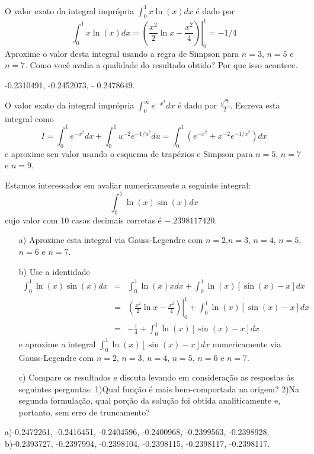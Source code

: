 \begin{Exercise}
O valor exato da integral imprópria $\int_0^1x\ln(x)dx$ é dado por
$$\int_0^1x\ln(x)dx=\left.\left(\frac{x^2}{2}\ln x-\frac{x^2}{4}\right)\right|_0^1=-1/4$$
Aproxime o valor desta integral usando a regra  de Simpson para $n=3$, $n=5$ e $n=7$. Como você avalia a qualidade do resultado obtido? Por que isso acontece.
\end{Exercise}
\begin{Answer}
  \begin{tiny}
-0.2310491, -0.2452073, - 0.2478649.    
  \end{tiny}
\end{Answer}

\begin{Exercise}
O valor exato da integral imprópria $\int_0^\infty e^{-x^2}dx$ é dado por $\frac{\sqrt{\pi}}{2}$.
Escreva esta integral como
$$I=\int_0^1 e^{-x^2}dx+\int_0^1 u^{-2} e^{-1/u^2}du=\int_0^1 \left(e^{-x^2}+x^{-2}e^{-1/x^2}\right)dx$$
e aproxime seu valor usando o esquema de trapézios e Simpson para $n=5$, $n=7$ e $n=9$.
\end{Exercise}

\begin{Exercise}
Estamos interessados em avaliar numericamente a seguinte integral:
$$\int_0^1 \ln(x)\sin(x)dx$$
cujo valor com 10 casas decimais corretas é $-.2398117420$.
\begin{itemize}
\item[a)] Aproxime esta integral via Gauss-Legendre com $n=2$,$n=3$, $n=4$, $n=5$, $n=6$ e $n=7$.
\item[b)] Use a identidade
\begin{eqnarray*}
\int_0^1 \ln(x)\sin(x)dx&=&\int_0^1 \ln(x)xdx+\int_0^1 \ln(x)\left[\sin(x)-x\right]dx\\
&=&\left.\left(\frac{x^2}{2}\ln x-\frac{x^2}{4}\right)\right|_0^1+\int_0^1 \ln(x)\left[\sin(x)-x\right]dx\\
&=&-\frac{1}{4}+\int_0^1 \ln(x)\left[\sin(x)-x\right]dx
\end{eqnarray*}
e aproxime a integral $\int_0^1 \ln(x)\left[\sin(x)-x\right]dx$ numericamente via Gauss-Legendre com $n=2$, $n=3$, $n=4$, $n=5$, $n=6$ e $n=7$.
\item[c)] Compare os resultados e discuta levando em consideração as respostas às seguintes perguntas: 1)Qual função é mais bem-comportada na origem? 2)Na segunda formulação, qual porção da solução foi obtida analiticamente e, portanto, sem erro de truncamento?
\end{itemize}
\end{Exercise}
\begin{Answer}
  \begin{tiny}
    a)-0.2472261,  -0.2416451,  -0.2404596,  -0.2400968,  -0.2399563,  -0.2398928.
    b)-0.2393727,  -0.2397994,  -0.2398104,  -0.2398115,  -0.2398117,  -0.2398117.  
  \end{tiny}
\end{Answer}

